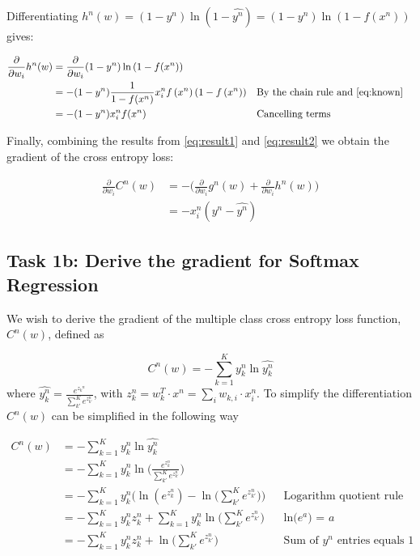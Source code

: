 \documentclass{article}
\begin{document}
Differentiating $h^n(w) = (1-y^n) \ln{(1-\hat{y^n})} = (1-y^n) \ln{(1-f(x^n))}$ gives:
 
\begin{align}
     \frac{\partial}{\partial w_i} h^n(w) &= 
     \frac{\partial}{\partial w_i} (1-y^n) \ln{(1-f(x^n))} \\
     &= -(1-y^n) \frac{1}{1-f(x^n)}x_{i}^{n} f\left(x^{n}\right)\left(1-f\left(x^{n}\right)\right) && \text{By the chain rule and \eqref{eq:known}} \\
     &= -(1-y^n)x_i^nf(x^n) && \text{Cancelling terms} \label{eq:result2}
\end{align}

Finally, combining the results from \eqref{eq:result1} and \eqref{eq:result2} we obtain the gradient of the cross entropy loss:

\begin{align}
    \frac{\partial}{\partial w_i} C^n(w) &= -\bigg(\frac{\partial}{\partial w_i} g^n(w) + \frac{\partial}{\partial w_i} h^n(w) \bigg) \\
    &= -x_i^n(y^n - \hat{y^n})
\end{align}

\subsection{Task 1b: Derive the gradient for Softmax Regression}

We wish to derive the gradient of the multiple class cross entropy loss function, $C^n(w)$, defined as

\begin{equation}
    C^n(w) = - \sum_{k=1}^K y_k^n \ln{\hat{y_k^n}}
    \label{eq:cn_def}
\end{equation}
where $\hat{y_k^n} = \frac{e^{z_k}^n}{\sum_{k'}^K e^{z_{k'}^n}}$, with $z_k^n = w_k^T \cdot x^n = \sum_i w_{k,i}\cdot x_i^n$. To simplify the differentiation $C^n(w)$  can be simplified in the following way

\begin{align}
    C^n(w) &= -\sum_{k=1}^K y_k^n \ln{\hat{y_k^n}} \\ 
    &= -\sum_{k=1}^K y_k^n \ln{\bigg(\frac{e^{z_k^n}}{\sum_{k'}^K e^{z_{k'}^n}}\bigg)} \\
    &= -\sum_{k=1}^K y_k^n \Bigg( \ln{(e^{z_k^n})} - \ln{\bigg(\sum_{k'}^K e^{z_{k'}^n}\bigg)} \Bigg) && \text{Logarithm quotient rule} \\
    &= -\sum_{k=1}^K y_k^n z_k^n +\sum_{k=1}^K y_k^n \ln{\bigg(\sum_{k'}^Ke^{z_{k'}^n}\bigg)} && \text{ln($e^a$) = $a$}\\
    &= -\sum_{k=1}^K y_k^n z_k^n +  \ln{\bigg(\sum_{k'}^Ke^{z_{k'}^n}\bigg)} && \text{Sum of $y^n$ entries equals 1} \label{eq:simplify_multi}
\end{align}
\end{document}
